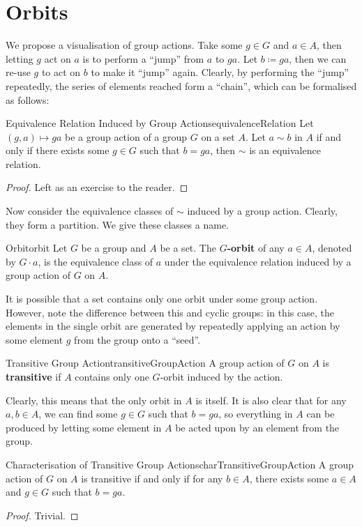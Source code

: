 \documentclass[math]{amznotes}
\theoremstyle{remark}
\newcommand{\0}{\mathbf{0}}
\newcommand{\1}{\mathbf{1}}
\begin{document}
\section{Orbits}
We propose a visualisation of group actions. Take some $g \in G$ and $a \in A$, then letting $g$ act on $a$ is to perform a ``jump'' from $a$ to $ga$. Let $b \coloneqq ga$, then we can re-use $g$ to act on $b$ to make it ``jump'' again. Clearly, by performing the ``jump'' repeatedly, the series of elements reached form a ``chain'', which can be formalised as follows:
\begin{probox}{Equivalence Relation Induced by Group Actions}{equivalenceRelation}
    Let $\left(g, a\right) \mapsto ga$ be a group action of a group $G$ on a set $A$. Let $a \sim b$ in $A$ if and only if there exists some $g \in G$ such that $b = ga$, then $\sim$ is an equivalence relation.
    \tcblower
    \begin{proof}
        Left as an exercise to the reader.
    \end{proof}
\end{probox}
Now consider the equivalence classes of $\sim$ induced by a group action. Clearly, they form a partition. We give these classes a name.
\begin{dfnbox}{Orbit}{orbit}
    Let $G$ be a group and $A$ be a set. The {\color{red} \textbf{$G$-orbit}} of any $a \in A$, denoted by $G \cdot a$, is the equivalence class of $a$ under the equivalence relation induced by a group action of $G$ on $A$.
\end{dfnbox}
It is possible that a set contains only one orbit under some group action. However, note the difference between this and cyclic groups: in this case, the elements in the single orbit are generated by repeatedly applying an action by some element $g$ from the group onto a ``seed''.
\begin{dfnbox}{Transitive Group Action}{transitiveGroupAction}
    A group action of $G$ on $A$ is {\color{red} \textbf{transitive}} if $A$ contains only one $G$-orbit induced by the action.
\end{dfnbox}
Clearly, this means that the only orbit in $A$ is itself. It is also clear that for any $a, b \in A$, we can find some $g \in G$ such that $b = ga$, so everything in $A$ can be produced by letting some element in $A$ be acted upon by an element from the group.
\begin{probox}{Characterisation of Transitive Group Actions}{charTransitiveGroupAction}
    A group action of $G$ on $A$ is transitive if and only if for any $b \in A$, there exists some $a \in A$ and $g \in G$ such that $b = ga$.
    \tcblower
    \begin{proof}
        Trivial.
    \end{proof}
\end{probox}
\end{document}
